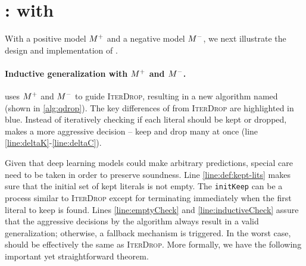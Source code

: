 \section{\dpy: \spc with \tool}
\label{sec:intergration}

With a positive model $M^+$ and a negative model $M^-$, we next illustrate the design and implementation of \dpy. 


\paragraph{Inductive generalization with $M^+$ and $M^-$.}
\dpy uses $M^+$ and $M^-$ to guide \textsc{IterDrop}, resulting in a new algorithm named \tool (shown in \cref{alg:qdrop}). The key differences of \tool from \textsc{IterDrop} are highlighted in blue.
Instead of iteratively checking if each literal should be kept or dropped, \tool makes a more aggressive decision -- keep and drop many at once (line \ref{line:deltaK}-\ref{line:deltaC}).

Given that deep learning models could make arbitrary predictions, special care need to be taken in order to preserve soundness. Line \ref{line:def:kept-lits} makes sure that the initial set of kept literals is not empty. The \texttt{initKeep} can be a process similar to \textsc{IterDrop} except for terminating immediately when the first literal to keep is found. Lines \ref{line:emptyCheck} and \ref{line:inductiveCheck} assure that the aggressive decisions by the algorithm always result in a valid generalization; otherwise, a fallback mechanism is triggered. 
In the worst case, \tool should be effectively the same as \textsc{IterDrop}.
More formally, we have the following important yet straightforward theorem. 

